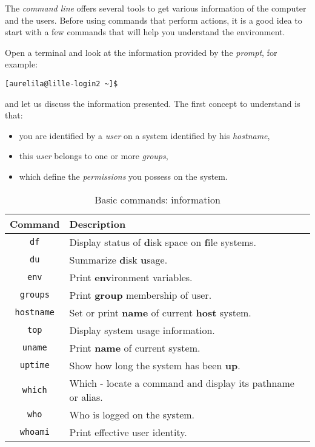 \documentclass[onecolumn, oneside, a4paper, 11pt]{memoir}
\theoremstyle{remark}
\begin{document}
The \textit{command line} offers several tools to get various information of the computer and the users.
Before using commands that perform actions, it is a good idea to start with a few commands that will help you understand the environment.

\medskip
Open a terminal and look at the information provided by the \textit{prompt}, for example:
\begin{lstlisting}[style=shell]
[aurelila@lille-login2 ~]$
\end{lstlisting}
and let us discuss the information presented.
The first concept to understand is that:
\begin{itemize}
\item you are identified by a \textit{user} on a system identified by his \textit{hostname},
\item this \textit{user} belongs to one or more \textit{groups},
\item which define the \textit{permissions} you possess on the system. 
\end{itemize}

\bigskip
\begin{table}[h!]
\centering
\caption{Basic commands: information}
\label{tab:inf}
\begin{tabular}{|c|l|}
  \hline
  Command & Description \\
  \hline
  \texttt{df} & Display status of \textbf{d}isk space on \textbf{f}ile systems. \\
  \texttt{du} & Summarize \textbf{d}isk \textbf{u}sage. \\
  \texttt{env} & Print \textbf{env}ironment variables. \\
  \texttt{groups} &  Print \textbf{group} membership of user.\\
  \texttt{hostname} &  Set or print \textbf{name} of current \textbf{host} system.\\
  \texttt{top} & Display system usage information. \\
  \texttt{uname} & Print \textbf{name} of current system. \\
  \texttt{uptime} & Show how long the system has been \textbf{up}. \\
  \texttt{which} &  Which - locate a command and display its pathname or alias. \\
  \texttt{who} &  Who is logged on the system. \\
  \texttt{whoami} &  Print effective user identity. \\
  \hline
\end{tabular}
\end{table}
\end{document}
